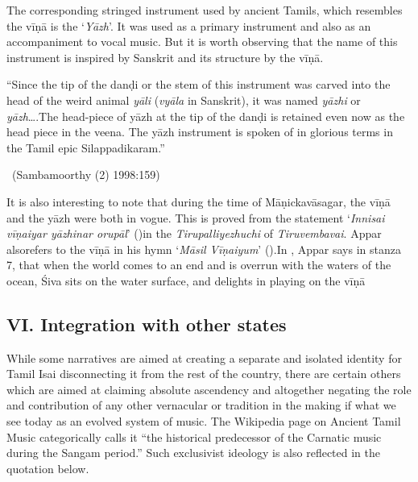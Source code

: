 The corresponding stringed instrument used by ancient Tamils, which resembles the vīṇā is the ‘\textit{Yāzh}’. It was used as a primary instrument and also as an accompaniment to vocal music. But it is worth observing that the name of this instrument is inspired by Sanskrit and its structure by the vīṇā.

\begin{myquote}
“Since the tip of the danḍi or the stem of this instrument was carved into the head of the weird animal \textit{yāli} (\textit{vyāla} in Sanskrit), it was named \textit{yāzhi} or \textit{yāzh}….The head-piece of yāzh at the tip of the danḍi is retained even now as the head piece in the veena. The yāzh instrument is spoken of in glorious terms in the Tamil epic Silappadikaram.”

~\hfill (Sambamoorthy (2) 1998:159)
\end{myquote}

It is also interesting to note that during the time of Māṇickavāsagar, the vīṇā and the yāzh were both in vogue. This is proved from the statement ‘\textit{Innisai vīṇaiyar yāzhinar orupāl}’ ()in the \textit{Tirupalliyezhuchi} of \textit{Tiruvembavai}. Appar also\break refers to the vīṇā in his hymn ‘\textit{Māsil Vīṇaiyum}’ ().In , Appar says in stanza 7, that when the world comes to an end and is overrun with the waters of the ocean, Śiva sits on the water surface, and delights in playing on the vīṇā 


\subsection*{VI. Integration with other states}

While some narratives are aimed at creating a separate and isolated identity for Tamil Isai disconnecting it from the rest of the country, there are certain others which are aimed at claiming absolute ascendency and altogether negating the role and contribution of any other vernacular or tradition in the making if what we see today as an evolved system of music. The Wikipedia page on Ancient Tamil Music categorically calls it “the historical predecessor of the Carnatic music during the Sangam period.” Such exclusivist ideology is also reflected in the quotation below.


